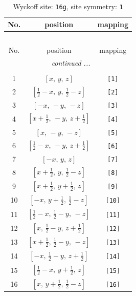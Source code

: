 \documentclass[fleqn,8pt]{jsarticle}
\begin{document}
\begin{longtable}{ccc}
\caption{Wyckoff site: {\tt 16g}, site symmetry: {\tt 1}}
 \\
 \hline \hline
No. & position & mapping \\ \hline \endfirsthead

\multicolumn{2}{l}{\tablename\ \thetable{}} \\
 \hline \hline
No. & position & mapping \\ \hline \endhead

 \hline \hline
\multicolumn{2}{r}{\footnotesize\it continued ...} \\ \endfoot

 \hline \hline
\multicolumn{2}{r}{} \\ \endlastfoot

1 & $\left[ x,\, y,\, z \right]$ & {\tt [1]} \\ \hline
2 & $\left[ \frac{1}{2} - x,\, y,\, \frac{1}{2} - z \right]$ & {\tt [2]} \\ \hline
3 & $\left[ - x,\, - y,\, - z \right]$ & {\tt [3]} \\ \hline
4 & $\left[ x + \frac{1}{2},\, - y,\, z + \frac{1}{2} \right]$ & {\tt [4]} \\ \hline
5 & $\left[ x,\, - y,\, - z \right]$ & {\tt [5]} \\ \hline
6 & $\left[ \frac{1}{2} - x,\, - y,\, z + \frac{1}{2} \right]$ & {\tt [6]} \\ \hline
7 & $\left[ - x,\, y,\, z \right]$ & {\tt [7]} \\ \hline
8 & $\left[ x + \frac{1}{2},\, y,\, \frac{1}{2} - z \right]$ & {\tt [8]} \\ \hline
9 & $\left[ x + \frac{1}{2},\, y + \frac{1}{2},\, z \right]$ & {\tt [9]} \\ \hline
10 & $\left[ - x,\, y + \frac{1}{2},\, \frac{1}{2} - z \right]$ & {\tt [10]} \\ \hline
11 & $\left[ \frac{1}{2} - x,\, \frac{1}{2} - y,\, - z \right]$ & {\tt [11]} \\ \hline
12 & $\left[ x,\, \frac{1}{2} - y,\, z + \frac{1}{2} \right]$ & {\tt [12]} \\ \hline
13 & $\left[ x + \frac{1}{2},\, \frac{1}{2} - y,\, - z \right]$ & {\tt [13]} \\ \hline
14 & $\left[ - x,\, \frac{1}{2} - y,\, z + \frac{1}{2} \right]$ & {\tt [14]} \\ \hline
15 & $\left[ \frac{1}{2} - x,\, y + \frac{1}{2},\, z \right]$ & {\tt [15]} \\ \hline
16 & $\left[ x,\, y + \frac{1}{2},\, \frac{1}{2} - z \right]$ & {\tt [16]} \\
\end{longtable}
\end{document}
